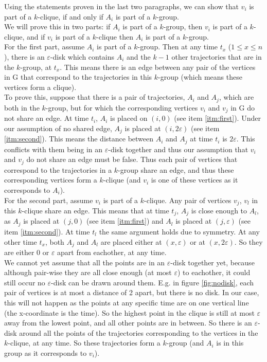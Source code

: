 \documentclass[a4paper,11pt]{article}
\begin{document}
Using the statements proven in the last two paragraphs, we can show that $v_i$ is part of a $k$-clique, if and only if $A_i$ is part of a $k$-group.\\
We will prove this in two parts: if $A_i$ is part of a $k$-group, then $v_i$ is part of a $k$-clique, and if $v_i$ is part of a $k$-clique then $A_i$ is part of a $k$-group.\\

For the first part, assume $A_i$ is part of a $k$-group. Then at any time $t_x$ ($1\leq x\leq n$), there is an $\varepsilon$-disk which contains $A_i$ and the $k-1$ other trajectories that are in the $k$-group, at $t_x$. This means there is an edge between any pair of the vertices in G that correspond to the trajectories in this $k$-group (which means these vertices form a clique).\\
To prove this, suppose that there is a pair of trajectories, $A_i$ and $A_j$, which are both in the $k$-group, but for which the corresponding vertices $v_i$ and $v_j$ in G do not share an edge. At time $t_i$, $A_i$ is placed on $(i, 0)$ (see item \ref{itm:first}). Under our assumption of no shared edge, $A_j$ is placed at $(i,2\varepsilon)$ (see item \ref{itm:second}). This means the distance between $A_i$ and $A_j$ at time $t_i$ is $2\varepsilon$. This conflicts with them being in an $\varepsilon$-disk together and thus our assumption that $v_i$ and $v_j$ do not share an edge must be false. Thus each pair of vertices that correspond to the trajectories in a $k$-group share an edge, and thus these corresponding vertices form a $k$-clique (and $v_i$ is one of these vertices as it corresponds to $A_i$).\\

For the second part, assume $v_i$ is part of a $k$-clique. Any pair of vertices $v_j$, $v_l$ in this $k$-clique share an edge. This means that at time $t_j$, $A_j$ is close enough to $A_l$, as $A_j$ is placed at $(j,0)$ (see item \ref{itm:first}) and $A_l$ is placed at $(j,\varepsilon)$ (see item \ref{itm:second}). At time $t_l$ the same argument holds due to symmetry. At any other time $t_x$, both $A_j$ and $A_l$ are placed either at $(x,\varepsilon)$ or at $(x,2\varepsilon)$. So they are either 0 or $\varepsilon$ apart from eachother, at any time.\\
We cannot yet assume that all the points are in an $\varepsilon$-disk together yet, because although pair-wise they are all close enough (at most $\varepsilon$) to eachother, it could still occur no $\varepsilon$-disk can be drawn around them. E.g. in figure \ref{fig:nodisk}, each pair of vertices is at most a distance of 2 apart, but there is no disk. In our case, this will not happen as the points at any specific time are on one vertical line (the x-coordinate is the time). So the highest point in the clique is still at most $\varepsilon$ away from the lowest point, and all other points are in between. So there is an $\varepsilon$-disk around all the points of the trajectories corresponding to the vertices in the $k$-clique, at any time. So these trajectories form a $k$-group (and $A_i$ is in this group as it corresponds to $v_i$).\\
\end{document}
